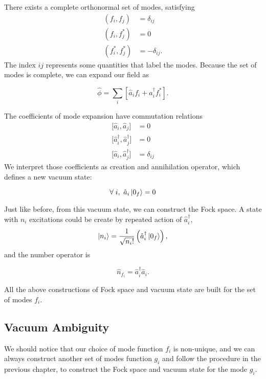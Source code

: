 \documentclass[12pt]{article}
\numberwithin{equation}{subsection}
\theoremstyle{mystyle}{\newtheorem{definition}{Definition}[subsection]}
\theoremstyle{mystyle}{\newtheorem{theorem}[definition]{Theorem}}
\theoremstyle{mystyle}{\newtheorem*{remark}{Remark}}
\theoremstyle{mystyle}{\newtheorem{example}{Example}[subsection]}
\theoremstyle{mystyle}{\newtheorem{examples}{Examples}[subsection]}
\theoremstyle{mystyle}{\newtheorem{cthm}{}[subsection]}
\begin{document}
There exists a complete orthonormal set of modes, satisfying
\begin{align}\label{orf}
  \left(f_{i},f_{j}\right)     & =\delta_{ij}   \\
  \left(f_{i},f^*_{j}\right)   & =0             \\
  \left(f^*_{i},f^*_{j}\right) & =-\delta_{ij}.
\end{align}
The index \(ij\) represents some quantities that label the modes.
Because the set of modes is complete, we can expand our field as
\begin{cthm}\label{cme}
  \[\hat{\phi}=\sum_i\left[\hat{a}_i f_i+\hat{a}_i^\dagger f_i^*\right].\]
\end{cthm}
The coefficients of mode expansion have commutation relations
\begin{align}
  \bigl[\hat{a}_{i},\hat{a}_{j}\bigr]                     & =0           \\
  \bigl[\hat{a}^{\dagger}_{i},\hat{a}^{\dagger}_{j}\bigr] & =0           \\
  \bigl[\hat{a}_{i},\hat{a}^{\dagger}_{j}\bigr]           & =\delta_{ij}
\end{align}
We interpret those coefficients as creation and annihilation operator, which defines a new vacuum state:
\begin{cthm}[\(f_i\) vacuum]
  \[\forall\;i,\ \hat{a}_i\ket{0_f}=0\]
\end{cthm}
Just like before, from this vacuum state, we can construct the Fock space.
A state with \(n_i\) excitations could be create by repeated action of \(\hat{a}^\dagger_i\),
\begin{equation}
  \ket{n_i}=\frac{1}{\sqrt{n_i!}}\left(\hat{a}_i^{\dagger}\ket{0_f}\right),
\end{equation}
and the number operator is
\begin{cthm}
  \[\hat{n}_{f_i}=\hat{a}_i^\dagger \hat{a}_i.\]
\end{cthm}

All the above constructions of Fock space and vacuum state are built for the set of modes \(f_i\).

\newpage
\subsection{Vacuum Ambiguity}
We should notice that our choice of mode function \(f_i\) is non-unique, and we can always construct another set of modes function
\(g_i\) and follow the procedure in the previous chapter, to construct the Fock space and vacuum state for the mode \(g_i\).
\end{document}
